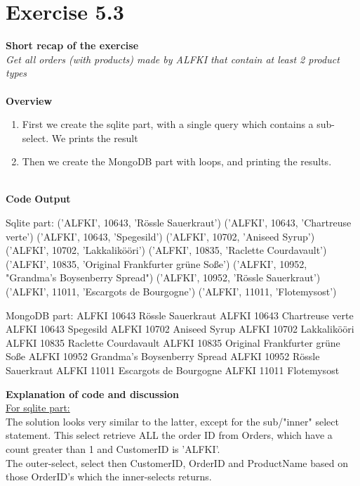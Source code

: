 \documentclass{article}
\newcommand\pythonstyle{\lstset{
language=python,
breaklines=true,
basicstyle=\ttfamily\small,
otherkeywords={1, 2, 3, 4, 5, 6, 7, 8 ,9 , 0, -, =, +, [, ], (, \), \{, \}, :, *, !},             %
keywordstyle=\color{blue},
emph={class, pass, in, for, while, if, is, elif, else, not, and, or, OR
    def, print, exec, break, continue, return},
emphstyle=\color{black}\bfseries,
emph={[2]True, False, None, self},
emphstyle=[2]\color{purple},
emph={[3]from, import, as},
emphstyle=[3]\color{blue},
stringstyle=\color{red},
frame=tb,
showstringspaces=false,
morecomment=[s]{"""}{"""},
commentstyle=\color{gray},
rulesepcolor=\color{blue},
title=\lstname
}}
\newcommand\pythonexternal[2][]{{
\pythonstyle
}}
\begin{document}
\section{Exercise 5.3}
\textbf{Short recap of the exercise}\\
\textit{Get all orders (with products) made by ALFKI that contain at least 2 product types}\\
~\\
\textbf{Overview}

\begin{enumerate}
  \item First we create the sqlite part, with a single query which contains a sub-select. We prints the result 
  \item Then we create the MongoDB part with loops, and printing the results. 
\end{enumerate}
~\\
\textbf{Code}
\textbf{Output}
\begin{pythonOutput}
Sqlite part:
('ALFKI', 10643, 'Rössle Sauerkraut')
('ALFKI', 10643, 'Chartreuse verte')
('ALFKI', 10643, 'Spegesild')
('ALFKI', 10702, 'Aniseed Syrup')
('ALFKI', 10702, 'Lakkalikööri')
('ALFKI', 10835, 'Raclette Courdavault')
('ALFKI', 10835, 'Original Frankfurter grüne Soße')
('ALFKI', 10952, "Grandma's Boysenberry Spread")
('ALFKI', 10952, 'Rössle Sauerkraut')
('ALFKI', 11011, 'Escargots de Bourgogne')
('ALFKI', 11011, 'Flotemysost')

MongoDB part:
ALFKI 10643 Rössle Sauerkraut
ALFKI 10643 Chartreuse verte
ALFKI 10643 Spegesild
ALFKI 10702 Aniseed Syrup
ALFKI 10702 Lakkalikööri
ALFKI 10835 Raclette Courdavault
ALFKI 10835 Original Frankfurter grüne Soße
ALFKI 10952 Grandma's Boysenberry Spread
ALFKI 10952 Rössle Sauerkraut
ALFKI 11011 Escargots de Bourgogne
ALFKI 11011 Flotemysost

\end{pythonOutput}
\textbf{Explanation of code and discussion}\\
\underline{For sqlite part:}~\\
The solution looks very similar to the latter, except for the sub/"inner" select statement. This select retrieve ALL the order ID from Orders, which have a count greater than 1 and CustomerID is 'ALFKI'. ~\\
The outer-select, select then CustomerID, OrderID and ProductName based on those OrderID's which the inner-selects returns. 
\end{document}
